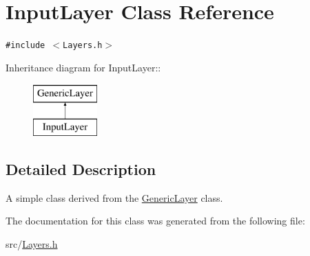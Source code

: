 \hypertarget{classInputLayer}{
\section{Input\-Layer Class Reference}
\label{classInputLayer}
}
{\tt \#include $<$Layers.h$>$}

Inheritance diagram for Input\-Layer::\begin{figure}[H]
\begin{center}
\leavevmode
\includegraphics[height=2cm]{classInputLayer}
\end{center}
\end{figure}


\subsection{Detailed Description}
A simple class derived from the \hyperlink{classGenericLayer}{Generic\-Layer} class. 



The documentation for this class was generated from the following file:\begin{CompactItemize}
\item 
src/\hyperlink{Layers_8h}{Layers.h}\end{CompactItemize}
